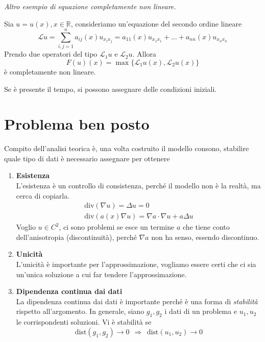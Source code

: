 \begin{itemize}
\begin{itemize}
                    \textit{Altro esempio di equazione completamente non lineare.}

                    Sia $u=u(x),x\in \mathbb{R}$, consideriamo un'equazione del secondo ordine lineare
                    \begin{equation*}
                        \mathcal{L} u=\sum ^{n}_{i,j=1} a_{ij}(x) u_{x_{i} x_{j}} =a_{11}(x) u_{x_{1} x_{1}} +\dotsc +a_{nn}(x) u_{x_{n} x_{n}}
                    \end{equation*}Prendo due operatori del tipo $\mathcal{L}_{1} u$ e $\mathcal{L}_{2} u$. Allora
                    \begin{equation*}
                        F(u)(x) =\max\{\mathcal{L}_{1} u(x),\mathcal{L}_{2} u(x)\}
                    \end{equation*}è completamente non lineare.
          \end{itemize}
\end{itemize}

Se è presente il tempo, si possono assegnare delle condizioni iniziali.
\section{Problema ben posto}

Compito dell'analisi teorica è, una volta costruito il modello consono, stabilire quale tipo di dati è necessario assegnare per ottenere
\begin{enumerate}
    \item \textbf{Esistenza}\\
          L'esistenza è un controllo di consistenza, perché il modello non è la realtà, ma cerca di copiarla.
          \begin{gather*}
              \mathrm{div}(\nabla u) =\Delta u=0\\
              \mathrm{div}(a(x) \nabla u) =\nabla a\cdotp \nabla u+a\Delta u
          \end{gather*}
          Voglio $u\in C^{2}$, ci sono problemi se esce un termine $a$ che tiene conto dell'anisotropia (discontinuità), perché $\nabla a$ non ha senso, essendo discontinuo.

    \item \textbf{Unicità}\\
          L'unicità è importante per l'approssimazione, vogliamo essere certi che ci sia un'unica soluzione a cui far tendere l'approssimazione.

    \item \textbf{Dipendenza continua dai dati}\\
          La dipendenza continua dai dati è importante perché è una forma di \textit{stabilità} rispetto all'argomento. In generale, siano $g_{1},g_{2}$ i dati di un problema e $u_{1},u_{2}$ le corrispondenti soluzioni. Vi è stabilità se
          \begin{equation*}
              \text{dist}(g_{1},g_{2})\rightarrow 0\ \ \Rightarrow \ \ \text{dist}(u_{1},u_{2})\rightarrow 0
          \end{equation*}
\end{enumerate}

